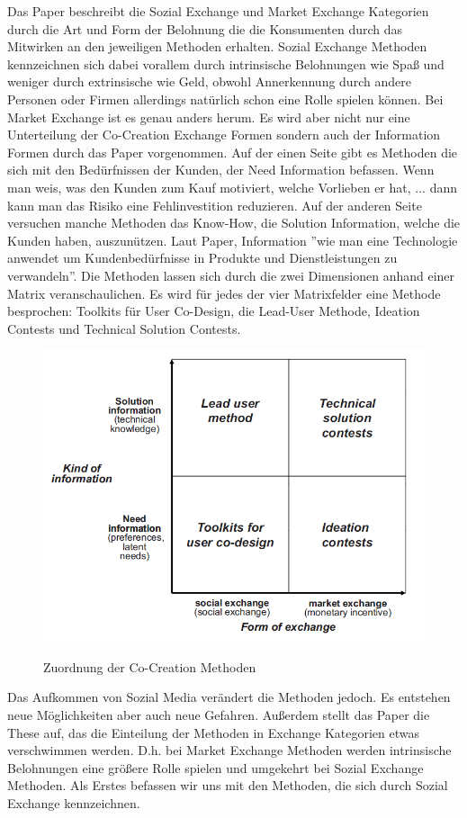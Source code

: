 Das Paper beschreibt die Sozial Exchange und Market Exchange Kategorien durch die Art und Form der Belohnung die die Konsumenten durch das Mitwirken an den jeweiligen Methoden erhalten. Sozial Exchange Methoden kennzeichnen sich dabei vorallem durch intrinsische Belohnungen wie Spa\ss{} und weniger durch extrinsische wie Geld, obwohl Annerkennung durch andere Personen oder Firmen allerdings nat\"urlich schon eine Rolle spielen k\"onnen. Bei Market Exchange ist es genau anders herum. Es wird aber nicht nur eine Unterteilung der Co-Creation Exchange Formen sondern auch der  Information Formen durch das Paper vorgenommen.
Auf der einen Seite gibt es Methoden die sich mit den Bed\"urfnissen der Kunden, der Need Information befassen. Wenn man weis, was den Kunden zum Kauf motiviert, welche Vorlieben er hat, ... dann kann man das Risiko eine Fehlinvestition reduzieren. Auf der anderen Seite versuchen manche Methoden das Know-How, die Solution Information, welche die Kunden haben, auszun\"utzen. Laut Paper, Information ''wie man eine Technologie anwendet um Kundenbed\"urfnisse in Produkte und Dienstleistungen zu verwandeln''. Die Methoden lassen sich durch die zwei Dimensionen anhand einer Matrix veranschaulichen. Es wird f\"ur jedes der vier Matrixfelder eine Methode besprochen: Toolkits f\"ur User Co-Design, die Lead-User Methode, Ideation Contests und Technical Solution Contests.
\pagebreak
\begin{figure}[h!]
	\caption{Zuordnung der Co-Creation Methoden\cite{COCREATION}}
	\centering
		\includegraphics[scale=0.8]{figures/Co-Creation_Matrix}
	\label{quirkyInfluence}
\end{figure}
Das Aufkommen von Sozial Media ver\"andert die Methoden jedoch. Es entstehen neue M\"oglichkeiten aber auch neue Gefahren. Au\ss{}erdem stellt das Paper die These auf, das die Einteilung der Methoden in Exchange Kategorien etwas verschwimmen werden. D.h. bei Market Exchange Methoden werden intrinsische Belohnungen eine gr\"o\ss{}ere Rolle spielen und umgekehrt bei Sozial Exchange Methoden. Als Erstes befassen wir uns mit den Methoden, die sich durch Sozial Exchange kennzeichnen.